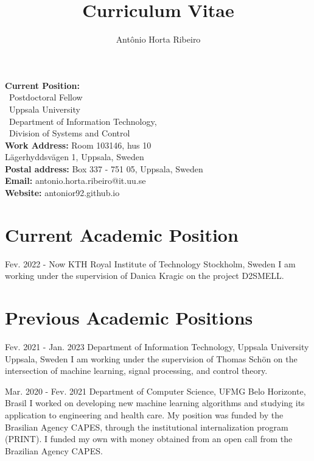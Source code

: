 \documentclass[10pt,letterpaper]{article} %
\title{Curriculum Vitae}
\author{Ant\^onio Horta Ribeiro}
\begin{document}
\maketitle

\begin{tcolorbox}[standard jigsaw, opacityback=0]
    \vspace{-4pt}
\begin{multicols}{2}
    \small
    \textbf{Current Position:}\\
    \, Postdoctoral Fellow\\
    \, Uppsala University \\
    \, Department of Information Technology,\\
    \, Division of Systems and Control\\
    {\bf Work Address:} Room 103146, hus 10 \\
    \phantom{\bf Work address:} Lägerhyddsvägen 1, Uppsala, Sweden\\
    {\bf Postal address:} Box 337 - 751 05, Uppsala, Sweden\\
    {\bf Email:} antonio.horta.ribeiro@it.uu.se\\
    {\bf Website:} antonior92.github.io
\end{multicols}
\end{tcolorbox}

\section*{Current Academic Position}

    { Fev. 2022 -   Now  }
    { KTH Royal Institute of Technology  }
    { Stockholm, Sweden  }
    { I am working under the supervision of Danica Kragic on the project D2SMELL.}

\section*{Previous Academic Positions} %


    { Fev. 2021 -   Jan. 2023  }
    { Department of Information Technology, Uppsala University  }
    { Uppsala, Sweden  }
    { I am working under the supervision of Thomas Schön on the intersection of machine learning, signal processing, and control theory.}

    { Mar. 2020 -   Fev. 2021  }
    { Department of Computer Science, UFMG  }
    { Belo Horizonte, Brasil  }
    { I worked on developing new machine learning algorithms and studying its application to engineering and health care. My position was funded by the Brasilian Agency CAPES, through the institutional internalization program (PRINT). I funded my own with money obtained from an open call from the Brazilian Agency CAPES.}
\end{document}

